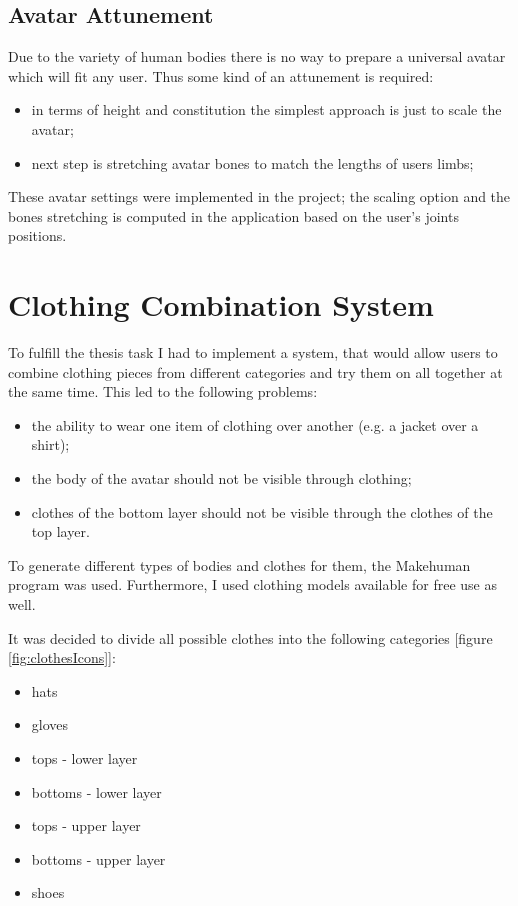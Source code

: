 \documentclass[a4paper]{report}
\begin{document}
\subsection{Avatar Attunement} 
\qquad Due to the variety of human bodies there is no way to prepare a universal avatar which will fit any user. Thus some kind of an attunement is required:

\begin{itemize}
    \item in terms of height and constitution the simplest approach is just to scale the avatar;
    \item next step is stretching avatar bones to match the lengths of users limbs;
\end{itemize}

These avatar settings were implemented in the project; the scaling option and the bones stretching is computed in the application based on the user's joints positions.




\section{Clothing Combination System}
\label{section_clothes_combo_system}

\qquad To fulfill the thesis task I had to implement a system, that would allow users to combine clothing pieces from different categories and try them on all together at the same time. This led to the following problems:

\begin{itemize}
    \item the ability to wear one item of clothing over another (e.g. a jacket over a shirt);
    \item the body of the avatar should not be visible through clothing;
    \item clothes of the bottom layer should not be visible through the clothes of the top layer.
\end{itemize}

To generate different types of bodies and clothes for them, the Makehuman program was used. Furthermore, I used clothing models available for free use as well.


It was decided to divide all possible clothes into the following categories [figure \ref{fig:clothesIcons}]:
\begin{itemize}
    \item hats
    \item gloves
    \item tops - lower layer
    \item bottoms - lower layer
    \item tops - upper layer
    \item bottoms - upper layer
    \item shoes
\end{itemize}
\end{document}
